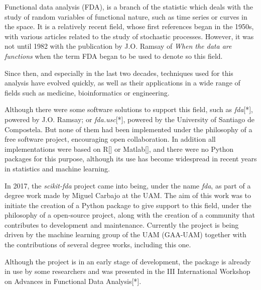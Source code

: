 

Functional data analysis (FDA), is a branch of the
statistic which deals with the study of random variables of
functional nature, such as time series or curves in the
space. It is a relatively recent field, whose first references
began in the 1950s, with various articles related to the study of stochastic
processes. However, it was not until 1982 with the publication by
J.O. Ramsay of \textit{When the data are functions}\cite{Ramsay1982} when the term FDA began
to be used to denote so this field.

Since then, and especially in the last two decades, techniques used for this analysis
have evolved quickly, as well as their applications in a wide range of fields
such as medicine, bioinformatics or engineering.

Although there were some software solutions to support this field, such as
\textit{fda}[*], powered by J.O. Ramsay; or \textit{fda.usc}[*], powered by the
University of Santiago de Compostela. But none of them had been implemented
under the philosophy of a free software project, encouraging open collaboration.
In addition all implementations were based on R[] or Matlab[], and there were no
Python packages for this purpose, although its use has become widespread in
recent years in statistics and machine learning.

In 2017, the \textit{scikit-fda} project came into being,
under the name \textit{fda}\cite{FDA2018}, as part of a degree work made by Miguel Carbajo
at the UAM. The aim of this work was to initiate the creation of a
Python package to give support to this field, under the philosophy of a open-source
project, along with the creation of a community that contributes to development
and maintenance. Currently the project is being driven by the machine
learning group of the UAM (GAA-UAM) together with the contributions of several
degree works, including this one.

Although the project is in an early stage of development, the package is already
in use by some researchers and was presented in the
III International Workshop on Advances in Functional Data Analysis[*].
